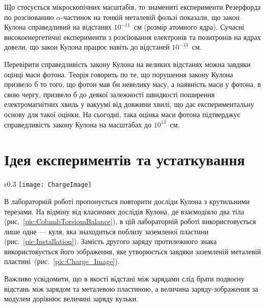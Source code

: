 Що стосується мікроскопічних масштабів, то знамениті експерименти Резерфорда по розсіюванню $\alpha$-частинок на тонкій металевій фользі показали, що закон Кулона справедливий на відстанях $10^{-11}$~см (розмір атомного ядра). Сучасні високоенергетичні експерименти з розсіювання електронів та позитронів на ядрах довели, що закон Кулона працює навіть до відстаней $10^{-13}$~см.

Перевірити справедливість закону Кулона на великих відстанях можна завдяки оцінці маси фотона. Теорія говорить по те, що порушення закону Кулона призвело б то того, що  фотон мав би невелику масу, а наявність маси у фотона, в свою чергу, призвело б до деякої залежності швидкості поширення електромагнітних хвиль у вакуумі від довжини хвилі, що дає експериментальну основу для такої оцінки.  На сьогодні, така оцінка маси фотона підтверджує справедливість закону Кулона на масштабах до $ 10^{13} $~см.


\section{Ідея експериментів та устаткування}

\begin{wrapfigure}{r}{0.3\linewidth}\centering
		\texttt{[image: ChargeImage]}
		\caption{Заряд та його зображення в заземленій металевій пластині}
		\label{pic:Charge_Image}
\end{wrapfigure}
В лабораторній роботі пропонується повторити досліди Кулона  з крутильними терезами. На відміну від класичних дослідів Кулона, де взаємодіяло два тіла (рис.~\ref{pic:ColumbTorsiomBalance}), в цій лабораторній роботі використовується лише одне --- куля, яка знаходиться поблизу заземленої пластини (рис.~\ref{pic:Installation}). Замість другого заряду протилежного знака використовується його зображення, яке утворюється завдяки заземленій металевій пластині~(рис.~\ref{pic:Charge_Image}).


Важливо усвідомити, що в якості відстані між зарядами слід брати подвоєну відстань між зарядом та металевою пластиною, а величина заряду-зображення за модулем дорівнює величині заряду кульки.

